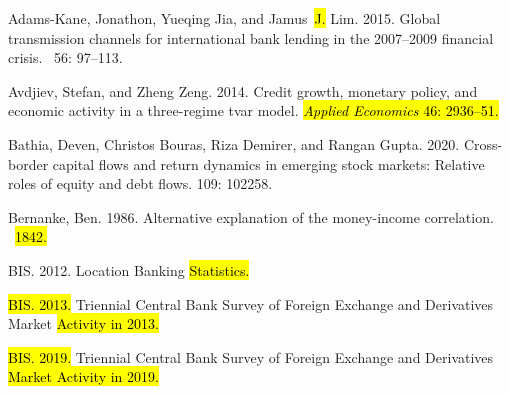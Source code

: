 \documentclass[jrfm,article,accept,moreauthors,pdftex]{Definitions/mdpi}
\begin{document}
\begin{thebibliography}{999}

{Adams-Kane}, Jonathon, Yueqing Jia, and Jamus~\hl{J.} %
 Lim. 2015.
\newblock Global transmission channels for international bank lending in the
  2007--2009 financial crisis.
~{56}: 97--113.

Avdjiev, Stefan, and Zheng Zeng. 2014.
\newblock Credit growth, monetary policy, and economic activity in a
  three-regime tvar model.
\newblock \hl{\emph{Applied Economics} {46}: 2936--51.} %


Bathia, Deven, Christos Bouras, Riza Demirer, and Rangan Gupta. 2020.
\newblock Cross-border capital flows and return dynamics in emerging stock
  markets: Relative roles of equity and debt flows.
 {109}: 102258.

Bernanke, Ben. 1986.
\newblock Alternative explanation of the money-income correlation.
~\hl{{1842}.} %


{BIS}. 2012.
 Location Banking \hl{Statistics.} %


\hl{BIS. 2013.} %
\newblock Triennial Central Bank Survey of Foreign Exchange and Derivatives
  Market \hl{Activity in 2013.} %


\hl{BIS. 2019.}
\newblock Triennial Central Bank Survey of Foreign Exchange and Derivatives
  \hl{Market Activity in 2019.}  %



\end{thebibliography}
\end{document}
